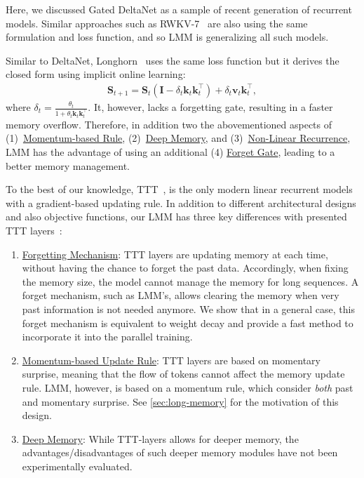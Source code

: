 Here, we discussed Gated DeltaNet as a sample of recent generation of recurrent models. Similar approaches such as RWKV-7~\citep{rwkv-repo} are also using the same formulation and loss function, and so LMM is generalizing all such models.  


Similar to DeltaNet, Longhorn~\citep{liu2024longhorn} uses the same loss function but it derives the closed form using implicit online learning: 
\begin{align}
    \mathbf{S}_{t+1} = \mathbf{S}_{t} \left( \mathbf{I} - \delta_t \mathbf{k}_t\mathbf{k}_t^{\top} \right) + \delta_t \mathbf{v}_t\mathbf{k}^{\top}_t,
\end{align}
where $\delta_t = \frac{\theta_t}{1 + \theta_t \mathbf{k}_t\mathbf{k}_t^{\top}}$.
It, however, lacks a forgetting gate, resulting in a faster memory overflow. Therefore, in addition two the abovementioned aspects of (1)~\underline{Momentum-based Rule}, (2)~\underline{Deep Memory}, and (3)~\underline{Non-Linear Recurrence}, LMM has the advantage of using an additional (4) \underline{Forget Gate}, leading to a better memory management. 

To the best of our knowledge, TTT~\citep{sun2024learning}, is the only modern linear recurrent models with a gradient-based updating rule. In addition to different architectural designs and also objective functions, our LMM has three key differences with presented TTT layers~\citep{sun2024learning}:
\begin{enumerate}
    \item \underline{Forgetting Mechanism}: TTT layers are updating memory at each time, without having the chance to forget the past data. Accordingly, when fixing the memory size, the model cannot manage the memory for long sequences. A forget mechanism, such as LMM's, allows clearing the memory when very past information is not needed anymore. We show that in a general case, this forget mechanism is equivalent to weight decay and provide a fast method to incorporate it into the parallel training.
    \item \underline{Momentum-based Update Rule}: TTT layers are based on momentary surprise, meaning that the flow of tokens cannot affect the memory update rule. LMM, however, is based on a momentum rule, which consider \emph{both} past and momentary surprise. See \autoref{sec:long-memory} for the motivation of this design.
    \item \underline{Deep Memory}: While TTT-layers allows for deeper memory, the advantages/disadvantages of such deeper memory modules have not been experimentally evaluated.  
\end{enumerate}

